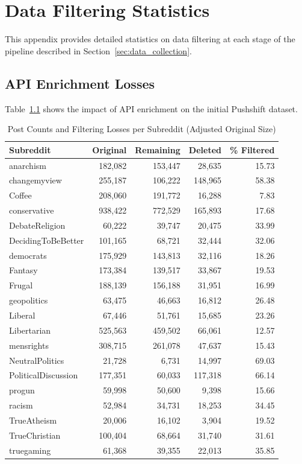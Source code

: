 \chapter{Data Filtering Statistics}
\label{app:filtering_stats}

This appendix provides detailed statistics on data filtering at each stage 
of the pipeline described in Section~\ref{sec:data_collection}.

\section{API Enrichment Losses}

Table~\ref{tab:subreddit_filtering} shows the impact of API enrichment on the initial Pushshift dataset.

\begin{table}[htbp]
\centering
\small
\caption{Post Counts and Filtering Losses per Subreddit (Adjusted Original Size)}
\label{tab:subreddit_filtering}
\begin{tabular}{lrrrr}
\hline
\textbf{Subreddit} & \textbf{Original} & \textbf{Remaining} & \textbf{Deleted} & \textbf{\% Filtered} \\
\hline
anarchism & 182{,}082 & 153{,}447 & 28{,}635 & 15.73 \\
changemyview & 255{,}187 & 106{,}222 & 148{,}965 & 58.38 \\
Coffee & 208{,}060 & 191{,}772 & 16{,}288 & 7.83 \\
conservative & 938{,}422 & 772{,}529 & 165{,}893 & 17.68 \\
DebateReligion & 60{,}222 & 39{,}747 & 20{,}475 & 33.99 \\
DecidingToBeBetter & 101{,}165 & 68{,}721 & 32{,}444 & 32.06 \\
democrats & 175{,}929 & 143{,}813 & 32{,}116 & 18.26 \\
Fantasy & 173{,}384 & 139{,}517 & 33{,}867 & 19.53 \\
Frugal & 188{,}139 & 156{,}188 & 31{,}951 & 16.99 \\
geopolitics & 63{,}475 & 46{,}663 & 16{,}812 & 26.48 \\
Liberal & 67{,}446 & 51{,}761 & 15{,}685 & 23.26 \\
Libertarian & 525{,}563 & 459{,}502 & 66{,}061 & 12.57 \\
mensrights & 308{,}715 & 261{,}078 & 47{,}637 & 15.43 \\
NeutralPolitics & 21{,}728 & 6{,}731 & 14{,}997 & 69.03 \\
PoliticalDiscussion & 177{,}351 & 60{,}033 & 117{,}318 & 66.14 \\
progun & 59{,}998 & 50{,}600 & 9{,}398 & 15.66 \\
racism & 52{,}984 & 34{,}731 & 18{,}253 & 34.45 \\
TrueAtheism & 20{,}006 & 16{,}102 & 3{,}904 & 19.52 \\
TrueChristian & 100{,}404 & 68{,}664 & 31{,}740 & 31.61 \\
truegaming & 61{,}368 & 39{,}355 & 22{,}013 & 35.85 \\
\hline
\end{tabular}
\end{table}

